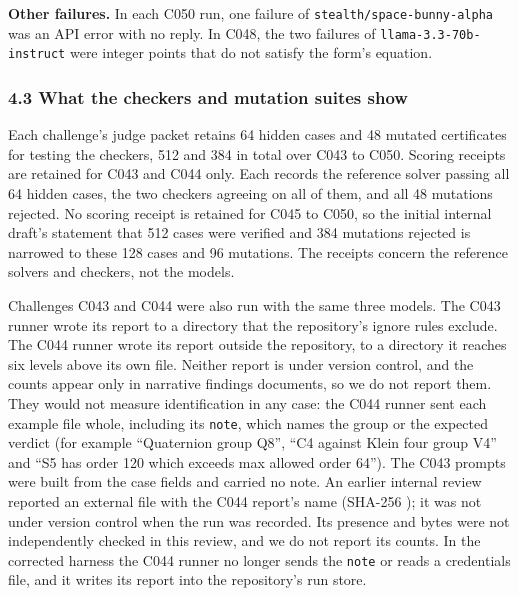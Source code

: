 \documentclass[
  11pt,
]{article}
\begin{document}
\textbf{Other failures.} In each C050 run, one failure of
\texttt{stealth/\allowbreak{}space-\allowbreak{}bunny-\allowbreak{}alpha}
was an API error with no reply. In C048, the two failures of
\texttt{llama-\allowbreak{}3.3-\allowbreak{}70b-\allowbreak{}instruct}
were integer points that do not satisfy the form's equation.

\hypertarget{what-the-checkers-and-mutation-suites-show}{%
\subsubsection{4.3 What the checkers and mutation suites
show}\label{what-the-checkers-and-mutation-suites-show}}

Each challenge's judge packet retains 64 hidden cases and 48 mutated
certificates for testing the checkers, 512 and 384 in total over C043 to
C050. Scoring receipts are retained for C043 and C044 only. Each records
the reference solver passing all 64 hidden cases, the two checkers
agreeing on all of them, and all 48 mutations rejected. No scoring
receipt is retained for C045 to C050, so the initial internal draft's
statement that 512 cases were verified and 384 mutations rejected is
narrowed to these 128 cases and 96 mutations. The receipts concern the
reference solvers and checkers, not the models.

Challenges C043 and C044 were also run with the same three models. The
C043 runner wrote its report to a directory that the repository's ignore
rules exclude. The C044 runner wrote its report outside the repository,
to a directory it reaches six levels above its own file. Neither report
is under version control, and the counts appear only in narrative
findings documents, so we do not report them. They would not measure
identification in any case: the C044 runner sent each example file
whole, including its \texttt{note}, which names the group or the
expected verdict (for example ``Quaternion group Q8'', ``C4 against
Klein four group V4'' and ``S5 has order 120 which exceeds max allowed
order 64''). The C043 prompts were built from the case fields and
carried no note. An earlier internal review reported an external file
with the C044 report's name (SHA-256
\texttt{});
it was not under version control when the run was recorded. Its presence
and bytes were not independently checked in this review, and we do not
report its counts. In the corrected harness the C044 runner no longer
sends the \texttt{note} or reads a credentials file, and it writes its
report into the repository's run store.
\end{document}
